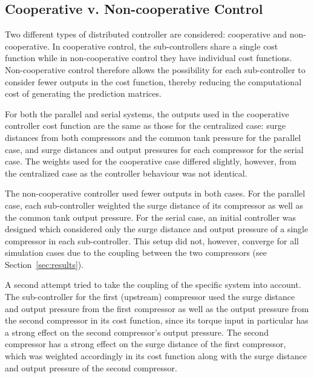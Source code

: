 \subsection{Cooperative v. Non-cooperative Control}
Two different types of distributed controller are considered: cooperative and non-cooperative. 
In cooperative control, the sub-controllers share a single cost function while in non-cooperative control they have individual cost functions. 
Non-cooperative control therefore allows the possibility for each sub-controller to consider fewer outputs in the cost function, thereby reducing the computational cost of generating the prediction matrices.

For both the parallel and serial systems, the outputs used in the cooperative controller cost function are the same as those for the centralized case: surge distances from both compressors and the common tank pressure for the parallel case, and surge distances and output pressures for each compressor for the serial case. 
The weights used for the cooperative case differed slightly, however, from the centralized case as the controller behaviour was not identical.

The non-cooperative controller used fewer outputs in both cases. 
For the parallel case, each sub-controller weighted the surge distance of its compressor as well as the common tank output pressure.
For the serial case, an initial controller was designed which considered only the surge distance and output pressure of a single compressor in each sub-controller. 
This setup did not, however, converge for all simulation cases due to the coupling between the two compressors (see Section~\ref{sec:results}).

A second attempt tried to take the coupling of the specific system into account.
The sub-controller for the first (upstream) compressor used the surge distance and output pressure from the first compressor as well as the output pressure from the second compressor in its cost function, since its torque input in particular has a strong effect on the second compressor's output pressure.
The second compressor has a strong effect on the surge distance of the first compressor, which was weighted accordingly in its cost function along with the surge distance and output pressure of the second compressor.

